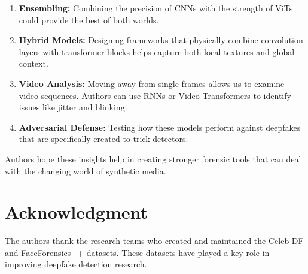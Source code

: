 \documentclass[conference]{IEEEtran}
\begin{document}
\begin{enumerate}
    \item \textbf{Ensembling:} Combining the precision of CNNs with the strength of ViTs could provide the best of both worlds.

    \item \textbf{Hybrid Models:} Designing frameworks that physically combine convolution layers with transformer blocks helps capture both local textures and global context.

    \item \textbf{Video Analysis:} Moving away from single frames allows us to examine video sequences. Authors can use RNNs or Video Transformers to identify issues like jitter and blinking.

    \item \textbf{Adversarial Defense:} Testing how these models perform against deepfakes that are specifically created to trick detectors.
\end{enumerate}

Authors hope these insights help in creating stronger forensic tools that can deal with the changing world of synthetic media.

\section*{Acknowledgment}
The authors thank the research teams who created and maintained the Celeb-DF and FaceForensics++ datasets. These datasets have played a key role in improving deepfake detection research.
\end{document}
